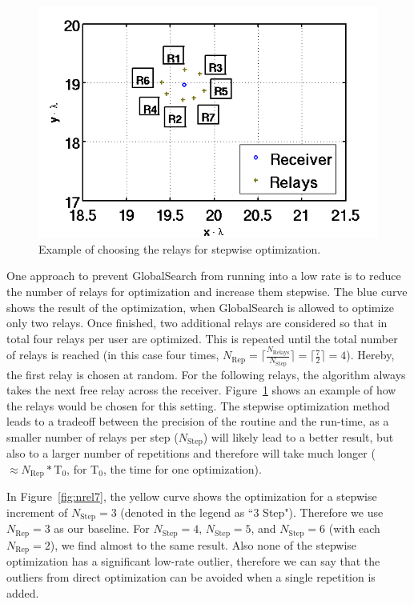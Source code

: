 \begin{figure}[h]
\centering
  \includegraphics[width=0.8\linewidth]{images/choice_of_relays.png}
\caption{Example of choosing the relays for stepwise optimization.}
\label{fig:rel_choice}
\end{figure}
One approach to prevent GlobalSearch from running into a low rate is to reduce the number of relays for optimization and increase them stepwise.
The blue curve shows the result of the optimization, when GlobalSearch is allowed to optimize only two relays.
Once finished, two additional relays are considered so that in total four relays per user are optimized.
This is repeated until the total number of relays is reached (in this case four times, $N_{\text{Rep}} = \lceil\frac{N_{\text{Relays}}}{N_{\text{Step}}}\rceil = \lceil\frac{7}{2}\rceil=4$).
Hereby, the first relay is chosen at random.
For the following relays, the algorithm always takes the next free relay across the receiver.
Figure~\ref{fig:rel_choice} shows an example of how the relays would be chosen for this setting.
The stepwise optimization method leads to a tradeoff between the precision of the routine and the run-time, as a smaller number of relays per step ($ N_{\text{Step}}$) will likely lead to a better result, but also to a larger number of repetitions and therefore will take much longer ($\approx N_{\text{Rep}}*\text{T}_0$, for $\text{T}_0$, the time for one optimization).


In Figure~\ref{fig:nrel7}, the yellow curve shows the optimization for a stepwise increment of $N_{\text{Step}}=3$ (denoted in the legend as ``3 Step").
Therefore we use $N_{\text{Rep}} = 3$ as our baseline.
For $N_{\text{Step}}=4$, $N_{\text{Step}}=5$, and $N_{\text{Step}}=6$ (with each $N_{\text{Rep}} = 2$), we find almost to the same result.
Also none of the stepwise optimization has a significant low-rate outlier, therefore we can say that the outliers from direct optimization can be avoided when a single repetition is added.

